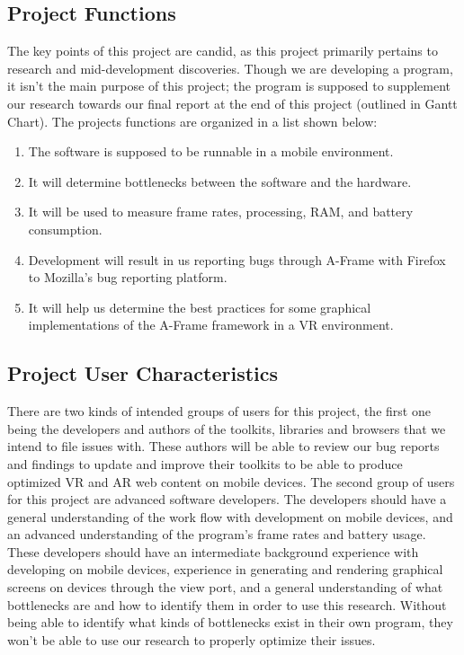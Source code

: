 \documentclass[letterpaper,10pt,titlepage,draftclsnofoot,onecolumn,compsoc,utf8,latin1]{IEEEtran}
\begin{document}
\subsection{Project Functions}
\begin{singlespace}
\noindent
The key points of this project are candid, as this project primarily pertains to research and mid-development discoveries. Though we are developing a program, it isn't the main purpose of this project; the program is supposed to supplement our research towards our final report at the end of this project (outlined in Gantt Chart). The projects functions are organized in a list shown below:\\
\begin{enumerate}[labelsep=2em,leftmargin=.5in]
    \item The software is supposed to be runnable in a mobile environment.
    \item It will determine bottlenecks between the software and the hardware.
    \item It will be used to measure frame rates, processing, RAM, and battery consumption.
    \item Development will result in us reporting bugs through A-Frame with Firefox to Mozilla's bug reporting platform.
    \item It will help us determine the best practices for some graphical implementations of the A-Frame framework in a VR environment.
\end{enumerate}
\end{singlespace}

\subsection{Project User Characteristics}
\begin{singlespace}
\noindent
There are two kinds of intended groups of users for this project, the first one being the developers and authors of the toolkits, libraries and browsers that we intend to file issues with. These authors will be able to review our bug reports and findings to update and improve their toolkits to be able to produce optimized VR and AR web content on mobile devices. The second group of users for this project are advanced software developers. The developers should have a general understanding of the work flow with development on mobile devices, and an advanced understanding of the program's frame rates and battery usage. These developers should have an intermediate background experience with developing on mobile devices, experience in generating and rendering graphical screens on devices through the view port, and a general understanding of what bottlenecks are and how to identify them in order to use this research. Without being able to identify what kinds of bottlenecks exist in their own program, they won't be able to use our research to properly optimize their issues.
\end{singlespace}
\end{document}

